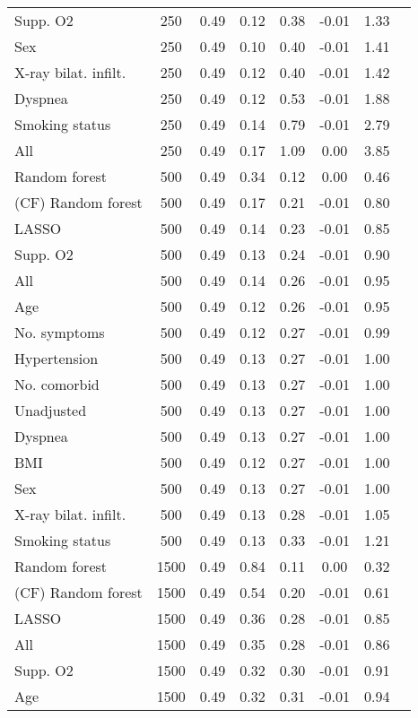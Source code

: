 \documentclass{article}
\begin{document}
{\begin{longtable}{lccccccc}
Supp. O2 & 250 & 0.49 & 0.12 & 0.38 & -0.01 & 1.33 \\ 
Sex & 250 & 0.49 & 0.10 & 0.40 & -0.01 & 1.41 \\ 
X-ray bilat. infilt. & 250 & 0.49 & 0.12 & 0.40 & -0.01 & 1.42 \\ 
Dyspnea & 250 & 0.49 & 0.12 & 0.53 & -0.01 & 1.88 \\ 
Smoking status & 250 & 0.49 & 0.14 & 0.79 & -0.01 & 2.79 \\ 
All & 250 & 0.49 & 0.17 & 1.09 &  0.00 & 3.85 \\ \midrule() 
Random forest & 500 & 0.49 & 0.34 & 0.12 &  0.00 & 0.46 \\ 
(CF) Random forest & 500 & 0.49 & 0.17 & 0.21 & -0.01 & 0.80 \\ 
LASSO & 500 & 0.49 & 0.14 & 0.23 & -0.01 & 0.85 \\ 
Supp. O2 & 500 & 0.49 & 0.13 & 0.24 & -0.01 & 0.90 \\ 
All & 500 & 0.49 & 0.14 & 0.26 & -0.01 & 0.95 \\ 
Age & 500 & 0.49 & 0.12 & 0.26 & -0.01 & 0.95 \\ 
No. symptoms & 500 & 0.49 & 0.12 & 0.27 & -0.01 & 0.99 \\ 
Hypertension & 500 & 0.49 & 0.13 & 0.27 & -0.01 & 1.00 \\ 
No. comorbid & 500 & 0.49 & 0.13 & 0.27 & -0.01 & 1.00 \\ 
Unadjusted & 500 & 0.49 & 0.13 & 0.27 & -0.01 & 1.00 \\ 
Dyspnea & 500 & 0.49 & 0.13 & 0.27 & -0.01 & 1.00 \\ 
BMI & 500 & 0.49 & 0.12 & 0.27 & -0.01 & 1.00 \\ 
Sex & 500 & 0.49 & 0.13 & 0.27 & -0.01 & 1.00 \\ 
X-ray bilat. infilt. & 500 & 0.49 & 0.13 & 0.28 & -0.01 & 1.05 \\ 
Smoking status & 500 & 0.49 & 0.13 & 0.33 & -0.01 & 1.21 \\ \midrule() 
Random forest & 1500 & 0.49 & 0.84 & 0.11 &  0.00 & 0.32 \\ 
(CF) Random forest & 1500 & 0.49 & 0.54 & 0.20 & -0.01 & 0.61 \\ 
LASSO & 1500 & 0.49 & 0.36 & 0.28 & -0.01 & 0.85 \\ 
All & 1500 & 0.49 & 0.35 & 0.28 & -0.01 & 0.86 \\ 
Supp. O2 & 1500 & 0.49 & 0.32 & 0.30 & -0.01 & 0.91 \\ 
Age & 1500 & 0.49 & 0.32 & 0.31 & -0.01 & 0.94 \\ 

\end{longtable}}
\end{document}
